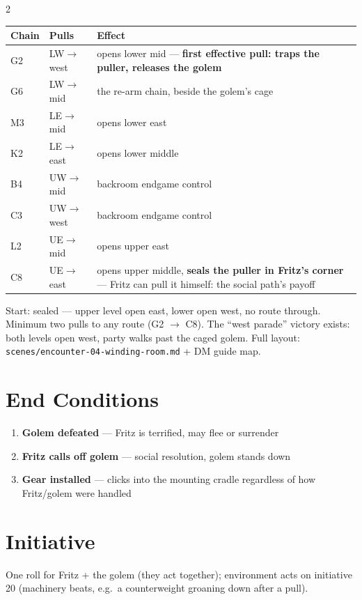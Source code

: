 \documentclass[10pt,letterpaper]{article}
\begin{document}
\begin{multicols}{2}
\begin{tabularx}{\columnwidth}{@{}llX@{}}
\toprule
\textbf{Chain} & \textbf{Pulls} & \textbf{Effect} \\
\midrule
G2 & LW$\to$west & opens lower mid --- \textbf{first effective pull: traps the puller, releases the golem} \\
G6 & LW$\to$mid & the re-arm chain, beside the golem's cage \\
M3 & LE$\to$mid & opens lower east \\
K2 & LE$\to$east & opens lower middle \\
B4 & UW$\to$mid & backroom endgame control \\
C3 & UW$\to$west & backroom endgame control \\
L2 & UE$\to$mid & opens upper east \\
C8 & UE$\to$east & opens upper middle, \textbf{seals the puller in Fritz's corner} --- Fritz can pull it himself: the social path's payoff \\
\bottomrule
\end{tabularx}

\vspace{4pt}
Start: sealed --- upper level open east, lower open west, no route through. Minimum two pulls to any route (G2 $\to$ C8). The ``west parade'' victory exists: both levels open west, party walks past the caged golem. Full layout: \texttt{scenes/encounter-04-winding-room.md} + DM guide map.

\section*{End Conditions}
\begin{enumerate}
\item \textbf{Golem defeated} --- Fritz is terrified, may flee or surrender
\item \textbf{Fritz calls off golem} --- social resolution, golem stands down
\item \textbf{Gear installed} --- clicks into the mounting cradle regardless of how Fritz/golem were handled
\end{enumerate}

\section*{Initiative}
One roll for Fritz + the golem (they act together); environment acts on initiative 20 (machinery beats, e.g.\ a counterweight groaning down after a pull).


\end{multicols}
\end{document}
